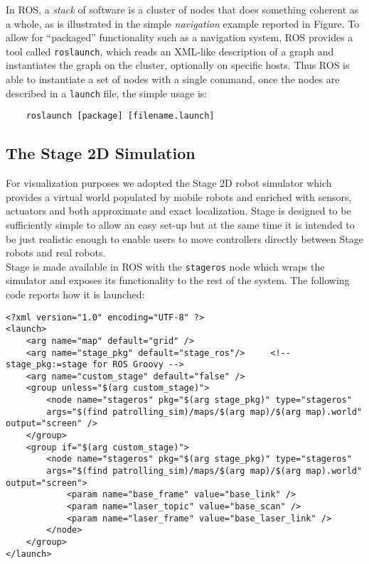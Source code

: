 In ROS, a \textit{stack} of software is a cluster of nodes that does something
coherent as a whole, as is illustrated in the simple \textit{navigation} example reported
in Figure. %
To allow for “packaged” functionality such as a navigation system, ROS provides
a tool called \texttt{roslaunch}, which reads an XML-like description of a graph and instantiates
the graph on the cluster, optionally on specific hosts.
Thus ROS is able to instantiate a set of nodes with a single
command, once the nodes are described in a \texttt{launch} file, the simple usage
is:
\begin{lstlisting}
    roslaunch [package] [filename.launch]
\end{lstlisting}

\subsection{The Stage 2D Simulation}
For visualization purposes we adopted the Stage 2D robot simulator
which provides a virtual world populated by mobile robots and enriched with
sensors, actuators and both approximate and exact localization. Stage is
designed to be sufficiently simple to allow an easy set-up but at the same time
it is intended to be just realistic enough to enable users to move controllers
directly between Stage robots and real robots. 
\\
Stage is made available in ROS with the \texttt{stageros} node which wraps the 
simulator and exposes its functionality to the rest of the system. The following 
code reports how it is launched:

\begin{lstlisting}
<?xml version="1.0" encoding="UTF-8" ?>
<launch>
    <arg name="map" default="grid" />
    <arg name="stage_pkg" default="stage_ros"/>     <!-- stage_pkg:=stage for ROS Groovy -->
    <arg name="custom_stage" default="false" />
    <group unless="$(arg custom_stage)"> 
        <node name="stageros" pkg="$(arg stage_pkg)" type="stageros" 
        args="$(find patrolling_sim)/maps/$(arg map)/$(arg map).world" output="screen" />
    </group>
    <group if="$(arg custom_stage)">   
        <node name="stageros" pkg="$(arg stage_pkg)" type="stageros" 
        args="$(find patrolling_sim)/maps/$(arg map)/$(arg map).world" output="screen">
            <param name="base_frame" value="base_link" />
            <param name="laser_topic" value="base_scan" />
            <param name="laser_frame" value="base_laser_link" />
        </node> 
    </group>
</launch>
\end{lstlisting}

